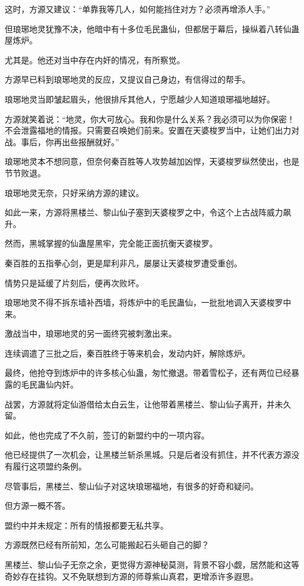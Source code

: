 \begin{this_body}
这时，方源又建议：“单靠我等几人，如何能挡住对方？必须再增添人手。”

但琅琊地灵犹豫不决，他暗中有十多位毛民蛊仙，但都居于幕后，操纵着八转仙蛊屋炼炉。

尤其是。他还对当中存在内奸的情况，有所察觉。

方源早已料到琅琊地灵的反应，又提议自己身边，有信得过的帮手。

琅琊地灵当即皱起眉头，他很排斥其他人，宁愿越少人知道琅琊福地越好。

方源就笑着说：“地灵，你大可放心。我和你是什么关系？我必须可以为你保密！不会泄露福地的情报。只需要召唤她们前来。安置在天婆梭罗当中，让她们出力对战。事后，你再出些报酬就好。”

琅琊地灵本不想同意，但奈何秦百胜等人攻势越加凶悍，天婆梭罗纵然使出，也是节节败退。

琅琊地灵无奈，只好采纳方源的建议。

如此一来，方源将黑楼兰、黎山仙子塞到天婆梭罗之中，令这个上古战阵威力飙升。

然而，黑城掌握的仙蛊屋黑牢，完全能正面抗衡天婆梭罗。

秦百胜的五指拳心剑，更是犀利非凡，屡屡让天婆梭罗遭受重创。

情势只是延缓了片刻后，便再次败坏。

琅琊地灵不得不拆东墙补西墙，将炼炉中的毛民蛊仙，一批批地调入天婆梭罗中来。

激战当中，琅琊地灵的另一面终究被刺激出来。

连续调遣了三批之后，秦百胜终于等来机会，发动内奸，解除炼炉。

最终，他抢夺到炼炉中的许多核心仙蛊，匆忙撤退。带着雪松子，还有两位已经暴露的毛民蛊仙内奸。

战罢，方源就将定仙游借给太白云生，让他带着黑楼兰、黎山仙子离开，并未久留。

如此，他也完成了不久前，签订的新盟约中的一项内容。

他已经提供了一次机会，让黑楼兰斩杀黑城。只是后者没有抓住，并不代表方源没有履行这项盟约条例。

尽管事后，黑楼兰、黎山仙子对这块琅琊福地，有很多的好奇和疑问。

但方源一概不答。

盟约中并未规定：所有的情报都要无私共享。

方源既然已经有所前知，怎么可能搬起石头砸自己的脚？

黑楼兰、黎山仙子无奈之余，更觉得方源神秘莫测，背景不容小觑，居然能和这等奇妙存在挂钩。又不免联想到方源的师尊紫山真君，更增添许多遐思。


\end{this_body}
